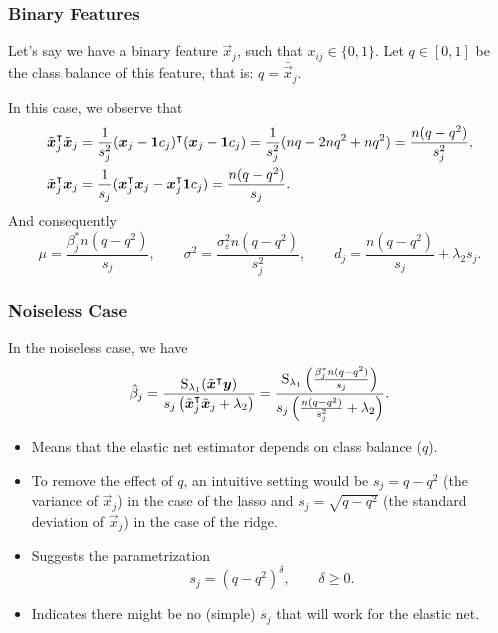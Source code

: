 \documentclass[10pt]{beamer}
\begin{document}
\begin{frame}[c]
  \frametitle{Binary Features}

  Let's say we have a binary feature \(\vec{x}_j\), such that \(x_{ij} \in \{0, 1\}\).
  Let \(q \in [0, 1]\) be the class balance of this feature, that is: \(q = \bar{\vec{x}}_j\).

  \bigskip

  In this case, we observe that
  \[
    \begin{aligned}
      \tilde{\boldsymbol{x}}_j^\intercal \tilde{\boldsymbol{x}}_j & = \frac{1}{s_j^2}(\boldsymbol{x}_j - \boldsymbol{1} c_j)^\intercal (\boldsymbol{x}_j - \boldsymbol{1} c_j) = \frac{1}{s^2_j}(nq - 2nq^2 + nq^2) = \frac{n(q-q^2)}{s^2_j}, \\
      \tilde{\boldsymbol{x}}_j^\intercal \boldsymbol{x}_j         & = \frac{1}{s_j}(\boldsymbol{x}_j^\intercal \boldsymbol{x}_j - \boldsymbol{x}_j^\intercal \boldsymbol{1} c_j) = \frac{n(q - q^2)}{s_j}.
    \end{aligned}
  \]
  \pause%
  And consequently
  \[
    \mu = \frac{\beta^*_j n(q - q^2)}{s_j}, \qquad \sigma^2 = \frac{\sigma_\varepsilon^2n(q - q^2)}{s^2_j}, \qquad d_j = \frac{n(q -q^2)}{s_j}  + \lambda_2 s_j.
  \]
\end{frame}

\begin{frame}[c]
  \frametitle{Noiseless Case}

  In the noiseless case, we have
  \[
    \hat{\beta}_j = \frac{\operatorname{S}_{\lambda_1}(\tilde{\boldsymbol{x}}^\intercal \boldsymbol{y})}{s_j\left(\tilde{\boldsymbol{x}}_j^\intercal \tilde{\boldsymbol{x}}_j + \lambda_2\right)}
    =
    \frac{\operatorname{S}_{\lambda_1}\left(\frac{\beta_j^* n (q - q^2)}{s_j}\right)}{s_j\left(\frac{n(q - q^2)}{s_j^2} + \lambda_2\right)}.
  \]
  \pause
  \begin{itemize}[<+->]
    \item Means that the elastic net estimator depends on class balance (\(q\)).
    \item To remove the effect of \(q\), an intuitive setting would be \(s_j = q - q^2\) (the variance of \(\vec{x}_j\)) in the case of the lasso and \(s_j = \sqrt{q-q^2}\) (the standard deviation of \(\vec{x}_j\)) in the case of the ridge.
    \item Suggests the parametrization
          \[
            s_j = (q - q^2)^\delta, \qquad \delta \geq 0.
          \]
    \item Indicates there might be no (simple) \(s_j\) that will work for the elastic net.
  \end{itemize}
\end{frame}
\end{document}
